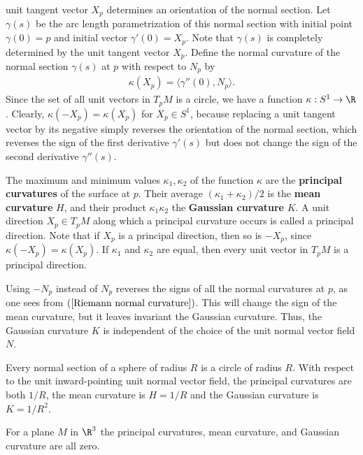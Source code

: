 unit tangent vector $X_p$ determines an orientation of the normal section. Let $\gamma(s)$ be the arc length parametrization of this normal section with initial point 
$\gamma(0)=p$ and initial vector $\gamma'(0)=X_p$. Note that $\gamma(s)$ is completely determined by the unit tangent vector $X_p$. Define the normal curvature of the 
normal section $\gamma(s)$ at $p$ with respect to $N_p$ by
\begin{align}\label{Riemann normal curvature}
\kappa(X_p)=\langle\gamma''(0),N_p\rangle.
\end{align}
Since the set of all unit vectors in $T_pM$ is a circle, we have a function $\kappa:S^1\to\R$. Clearly, $\kappa(-X_p)=\kappa(X_p)$ for $X_p\in S^1$, because replacing 
a unit tangent vector by its negative simply reverses the orientation of the normal section, which reverses the sign of the first derivative $\gamma'(s)$ but does not 
change the sign of the second derivative $\gamma''(s)$.\par
The maximum and minimum values $\kappa_1,\kappa_2$ of the function $\kappa$ are the \textbf{principal curvatures} of the surface at $p$. Their average 
$(\kappa_1+\kappa_2)/2$ is the \textbf{mean curvature} $H$, and their product $\kappa_1\kappa_2$ the \textbf{Gaussian curvature} $K$. A unit direction $X_p\in T_pM$ along which 
a principal curvature occurs is called a principal direction. Note that if $X_p$ is a principal direction, then so is $-X_p$, since $\kappa(-X_p)=\kappa(X_p)$. If 
$\kappa_1$ and $\kappa_2$ are equal, then every unit vector in $T_pM$ is a principal direction.
\begin{remark}
Using $-N_p$ instead of $N_p$ reverses the signs of all the normal curvatures at $p$, as one sees from $(\ref{Riemann normal curvature})$. This will change the sign 
of the mean curvature, but it leaves invariant the Gaussian curvature. Thus, the Gaussian curvature $K$ is independent of the choice of the unit normal vector field $N$.
\end{remark}
\begin{example}
Every normal section of a sphere of radius $R$ is a circle of radius $R$. With respect to the unit inward-pointing unit normal vector field, the principal curvatures 
are both $1/R$, the mean curvature is $H=1/R$ and the Gaussian curvature is $K=1/R^2$.
\end{example}
\begin{example}
For a plane $M$ in $\R^3$ the principal curvatures, mean curvature, and Gaussian curvature are all zero.
\end{example}
